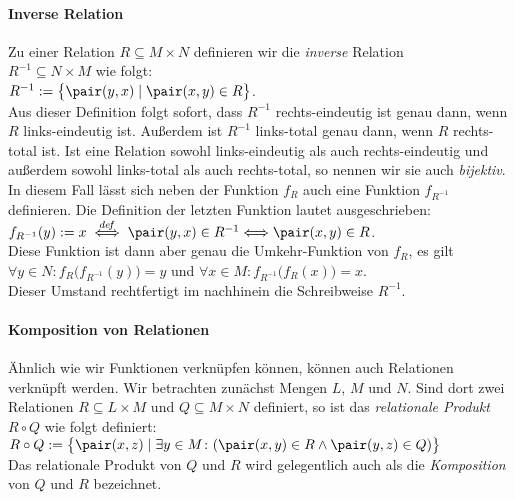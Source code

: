 \paragraph{Inverse Relation}
Zu einer  Relation $R \subseteq M \times N$ definieren wir die \emph{inverse} Relation \\
$R^{-1} \subseteq N \times M$ wie folgt: \\[0.2cm]
\hspace*{1.3cm} $R^{-1} := \bigl\{ \pair(y,x) \mid \pair(x,y) \in R  \bigr\}$. \\[0.2cm]
Aus dieser Definition folgt sofort, dass $R^{-1}$ rechts-eindeutig ist genau dann, wenn
$R$ links-eindeutig ist.  Außerdem ist $R^{-1}$ links-total genau dann, wenn $R$
rechts-total ist.  Ist eine Relation sowohl links-eindeutig als auch rechts-eindeutig und
außerdem sowohl links-total als auch rechts-total, so nennen wir sie auch \emph{bijektiv}.
In diesem Fall lässt sich neben der Funktion
$f_R$ auch eine Funktion $f_{R^{-1}}$ definieren.  Die Definition der letzten Funktion
lautet ausgeschrieben: \\[0.2cm]
\hspace*{1.3cm} $f_{R^{-1}}(y) := x \;\stackrel{de\!f}{\Longleftrightarrow}\; \pair(y,x) \in R^{-1} \Longleftrightarrow \pair(x,y) \in R$. \\[0.2cm]
Diese Funktion ist dann aber genau die Umkehr-Funktion von $f_R$, es gilt \\[0.2cm]
\hspace*{1.3cm}
 $\forall y \in N \colon f_R\bigl(f_{R^{-1}}(y)\bigr) = y$ \quad und \quad
 $\forall x \in M \colon f_{R^{-1}}\bigl(f_R(x)\bigr) = x$. \\[0.2cm]
Dieser Umstand rechtfertigt im nachhinein die Schreibweise $R^{-1}$.

\paragraph{Komposition von Relationen}
Ähnlich wie wir Funktionen verknüpfen können, können auch Relationen verknüpft werden.
Wir betrachten zunächst Mengen $L$, $M$ und $N$.
Sind dort zwei Relationen $R \subseteq L \times M$ und $Q \subseteq M \times N$ definiert,
so ist das \emph{relationale Produkt} $R \circ Q$ wie folgt definiert: \\[0.2cm]
\hspace*{1.3cm}
$R \circ Q := \bigl\{ \pair(x,z) \mid \exists y \in M \colon(\pair(x,y) \in R \wedge \pair(y,z) \in Q) \bigr\}$ 
\\[0.2cm]
Das relationale Produkt von $Q$ und $R$ wird gelegentlich auch als die \emph{Komposition} von
$Q$ und $R$ bezeichnet.  

